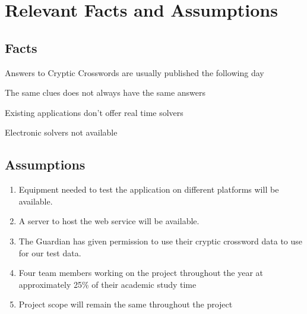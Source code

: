 \section{Relevant Facts and Assumptions}

\subsection{Facts}

\noindent\llap{\textbf{[I1/1]}}Answers to Cryptic Crosswords are usually published the following day

\noindent\llap{\textbf{[I2/1]}}The same clues does not always have the same answers

\noindent\llap{\textbf{[I3/1]}}Existing applications don't offer real time solvers

\noindent\llap{\textbf{[I4/1]}}Electronic solvers not available

\subsection{Assumptions}

\begin{enumerate}
\item Equipment needed to test the application on different platforms will be
available.
\item A server to host the web service will be available.
\item The Guardian has given permission to use their cryptic crossword data to use for
our test data.
\item Four team members working on the project throughout the year at approximately
25\% of their academic study time
\item Project scope will remain the same throughout the project
\end{enumerate}